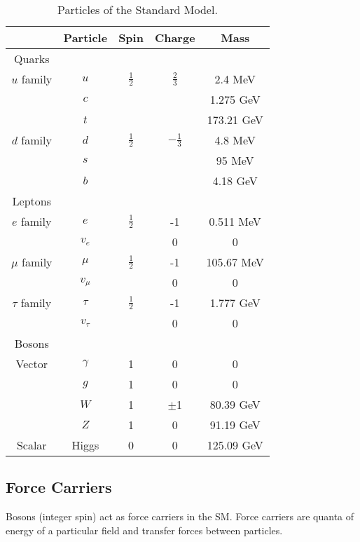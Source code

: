 \begin{table}[!htb]
	\centering
	\caption{Particles of the Standard Model.}
	\begin{tabular}{c||c|c|c|c|}
		\hline 
			&	Particle	&	Spin		&	Charge	&	Mass \\
		\hline \hline
		Quarks	&	&	&	&	\\
		\hline
		$u$ family	&	$u$	&	$\frac{1}{2}$	&	$\frac{2}{3}$	&	2.4 MeV \\
				&	$c$	&		&		&	1.275 GeV \\
				&	$t$	&		&		&	173.21 GeV \\

		$d$ family	&	$d$	&	$\frac{1}{2}$	&	$-\frac{1}{3}$	&	4.8 MeV \\
				&	$s$	&		&		&	95 MeV \\
				&	$b$	&		&		&	4.18 GeV \\
		\hline		
		Leptons 	&	&	&	&	\\
		\hline
		$e$ family	&	$e$	&	$\frac{1}{2}$	&	-1	&	0.511 MeV \\
				&	$v_{e}$	&		&	0	&	0 \\
		$\mu$ family	&	$\mu$	&	$\frac{1}{2}$	&	-1	&	105.67 MeV \\
				&	$v_{\mu}$	&		&	0	&	0 \\	
		$\tau$ family	&	$\tau$	&	$\frac{1}{2}$	&	-1	&	1.777 GeV \\
				&	$v_{\tau}$	&		&	0	&	0 \\	
		\hline
		Bosons 	&	&	&	&	\\
		\hline
		Vector 	&	$\gamma$	&	1	&	0	&	0 \\
				&	$g$			&	1	&	0	&	0 \\
				&	$W$		&	1	&	$\pm$1	&	80.39 GeV \\
				&	$Z$		&	1	&	0		&	91.19 GeV \\
		Scalar	&	Higgs	&	0	&	0		&	125.09 GeV \\
		\hline \hline			
	\end{tabular}
	\label{tab:SMparticles}
\end{table}		



\subsection{Force Carriers}

Bosons (integer spin) act as force carriers in the SM.  Force carriers are quanta of energy of a particular field and transfer forces between particles. \\ %



